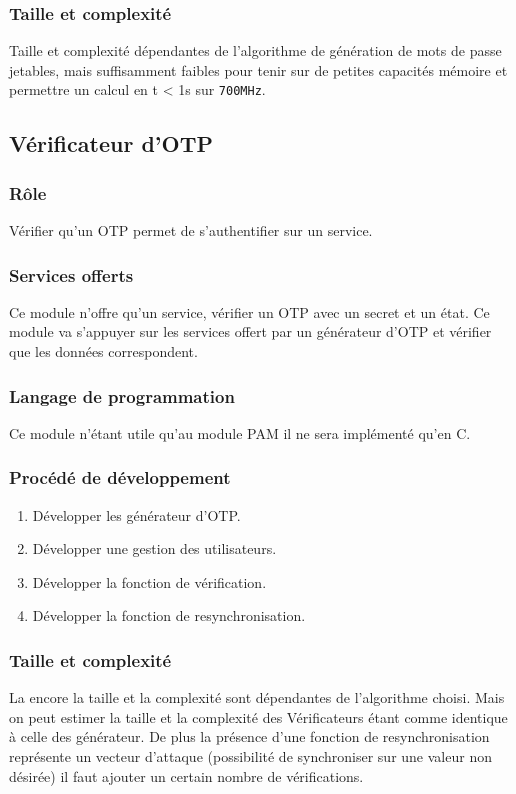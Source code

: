 \documentclass{"../../res/univ-projet"}
\begin{document}
    \subsubsection{Taille et complexité}
            Taille et complexité dépendantes de l'algorithme de génération
        de mots de passe jetables, mais suffisamment faibles pour tenir sur
        de petites capacités mémoire et permettre un calcul 
        en t < 1s sur \verb?700MHz?.

\subsection{Vérificateur d'OTP}
  \subsubsection{Rôle}
    Vérifier qu'un OTP permet de s'authentifier sur un service.
    
  \subsubsection{Services offerts}
    Ce module n'offre qu'un service, vérifier un OTP avec un secret
    et un état. Ce module va s'appuyer sur les services offert par
    un générateur d'OTP et vérifier que les données correspondent.
    
  \subsubsection{Langage de programmation}
    Ce module n'étant utile qu'au module PAM il ne sera implémenté qu'en C.
    
  \subsubsection{Procédé de développement}
  \begin{enumerate}
   \item Développer les générateur d'OTP.
   \item Développer une gestion des utilisateurs.
   \item Développer la fonction de vérification.
   \item Développer la fonction de resynchronisation.
  \end{enumerate}
  
  \subsubsection{Taille et complexité}
  La encore la taille et la complexité sont dépendantes de l'algorithme 
  choisi. Mais on peut estimer la taille et la complexité des Vérificateurs
  étant comme identique à celle des générateur. De plus la présence d'une fonction
  de resynchronisation représente un  vecteur d'attaque (possibilité de synchroniser
  sur une valeur non désirée) il faut ajouter un certain nombre de vérifications.
  
\end{document}

